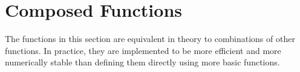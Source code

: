 \section{Composed Functions}\label{composed-functions.section}

The functions in this section are equivalent in theory to combinations
of other functions.  In practice, they are implemented to be more
efficient and more numerically stable than defining them directly
using more basic \Stan functions.
%
\begin{description}
\end{description}
